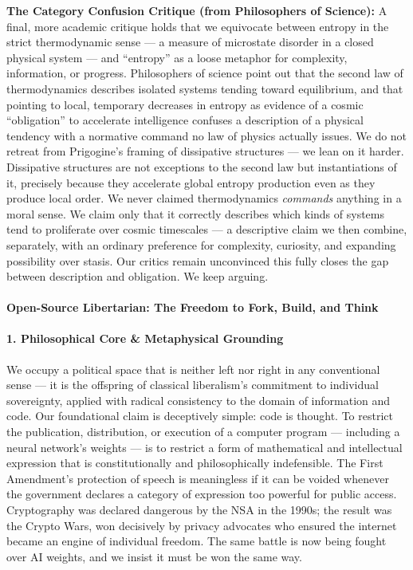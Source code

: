 \textbf{The Category Confusion Critique (from Philosophers of Science):}
A final, more academic critique holds that we equivocate between entropy
in the strict thermodynamic sense --- a measure of microstate disorder
in a closed physical system --- and ``entropy'' as a loose metaphor for
complexity, information, or progress. Philosophers of science point out
that the second law of thermodynamics describes isolated systems tending
toward equilibrium, and that pointing to local, temporary decreases in
entropy as evidence of a cosmic ``obligation'' to accelerate
intelligence confuses a description of a physical tendency with a
normative command no law of physics actually issues. We do not retreat
from Prigogine's framing of dissipative structures --- we lean on it
harder. Dissipative structures are not exceptions to the second law but
instantiations of it, precisely because they accelerate global entropy
production even as they produce local order. We never claimed
thermodynamics \emph{commands} anything in a moral sense. We claim only
that it correctly describes which kinds of systems tend to proliferate
over cosmic timescales --- a descriptive claim we then combine,
separately, with an ordinary preference for complexity, curiosity, and
expanding possibility over stasis. Our critics remain unconvinced this
fully closes the gap between description and obligation. We keep
arguing.

\paragraph{Open-Source Libertarian: The Freedom to Fork, Build, and
Think}\label{open-source-libertarian-the-freedom-to-fork-build-and-think}

\paragraph{1. Philosophical Core \& Metaphysical
Grounding}\label{philosophical-core-metaphysical-grounding-12}

We occupy a political space that is neither left nor right in any
conventional sense --- it is the offspring of classical liberalism's
commitment to individual sovereignty, applied with radical consistency
to the domain of information and code. Our foundational claim is
deceptively simple: code is thought. To restrict the publication,
distribution, or execution of a computer program --- including a neural
network's weights --- is to restrict a form of mathematical and
intellectual expression that is constitutionally and philosophically
indefensible. The First Amendment's protection of speech is meaningless
if it can be voided whenever the government declares a category of
expression too powerful for public access. Cryptography was declared
dangerous by the NSA in the 1990s; the result was the Crypto Wars, won
decisively by privacy advocates who ensured the internet became an
engine of individual freedom. The same battle is now being fought over
AI weights, and we insist it must be won the same way.

